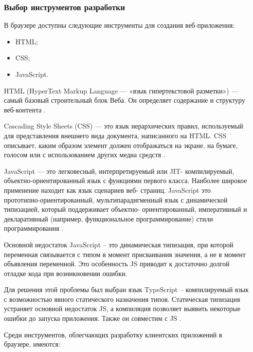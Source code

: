
\subsubsection{Выбор инструментов разработки}

В браузере доступны следующие инструменты для создания веб-приложения:
\begin{itemize}
	\item HTML;
	\item CSS;
	\item JavaScript.
\end{itemize}

HTML (HyperText Markup Language — «язык гипертекстовой разметки»)
— самый базовый строительный блок Веба. Он определяет содержание и
структуру веб-контента .

Cascading Style Sheets (CSS) — это язык иерархических правил,
используемый для представления внешнего вида документа, написанного на
HTML. CSS описывает, каким образом элемент должен отображаться на
экране, на бумаге, голосом или с использованием других медиа средств .

JavaScript — это легковесный, интерпретируемый или JIT-
компилируемый, объектно-ориентированный язык с функциями первого
класса. Наиболее широкое применение находит как язык сценариев веб-
страниц. JavaScript это прототипно-ориентированный, мультипарадигменный
язык с динамической типизацией, который поддерживает объектно-
ориентированный, императивный и декларативный (например,
функциональное программирование) стили программирования .

Основной недостаток JavaScript – это динамическая типизация, при
которой переменная связывается с типом в момент присваивания значения, а
не в момент объявления переменной. Это особенность JS приводит к
достаточно долгой отладке кода при возникновении ошибки.

Для решения этой проблемы был выбран язык TypeScript –
компилируемый язык с возможностью явного статического назначения типов.
Статическая типизация устраняет основной недостаток JS, а компиляция
позволяет выявить некоторые ошибки до запуска приложения. Также он
совместим с JS .

Среди инструментов, облегчающих разработку клиентских приложений
в браузере, имеются:


